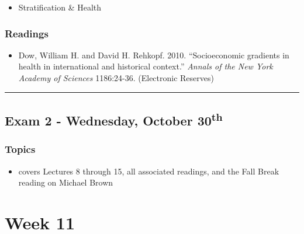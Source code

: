 \documentclass[]{book}
\providecommand{\tightlist}{%
  \setlength{\itemsep}{0pt}\setlength{\parskip}{0pt}}
\begin{document}
\begin{itemize}
\tightlist
\item
  Stratification \& Health
\end{itemize}

\hypertarget{readings-17}{%
\subsubsection*{Readings}\label{readings-17}}

\begin{itemize}
\tightlist
\item
  Dow, William H. and David H. Rehkopf. 2010. ``Socioeconomic gradients in health in international and historical context.'' \emph{Annals of the New York Academy of Sciences} 1186:24-36. (Electronic Reserves)
\end{itemize}

\begin{center}\rule{0.5\linewidth}{\linethickness}\end{center}

\hypertarget{exam-2---wednesday-october-30th}{%
\subsection*{\texorpdfstring{Exam 2 - Wednesday, October 30\textsuperscript{th}}{Exam 2 - Wednesday, October 30th}}\label{exam-2---wednesday-october-30th}}

\hypertarget{topics-19}{%
\subsubsection*{Topics}\label{topics-19}}

\begin{itemize}
\tightlist
\item
  covers Lectures 8 through 15, all associated readings, and the Fall Break reading on Michael Brown
\end{itemize}

\newpage

\hypertarget{week-11}{%
\section*{Week 11}\label{week-11}}
\end{document}
